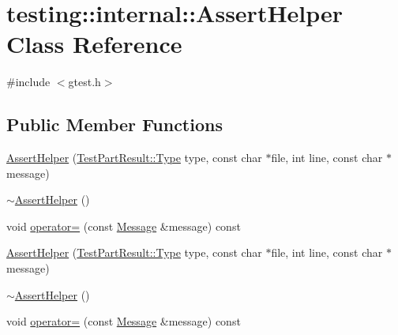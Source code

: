 \hypertarget{classtesting_1_1internal_1_1_assert_helper}{\section{testing\-:\-:internal\-:\-:Assert\-Helper Class Reference}
\label{classtesting_1_1internal_1_1_assert_helper}
}


{\ttfamily \#include $<$gtest.\-h$>$}

\subsection*{Public Member Functions}
\begin{DoxyCompactItemize}
\item 
\hyperlink{classtesting_1_1internal_1_1_assert_helper_ac2c9334518fd4087189b4505567a3c90}{Assert\-Helper} (\hyperlink{classtesting_1_1_test_part_result_a65ae656b33fdfdfffaf34858778a52d5}{Test\-Part\-Result\-::\-Type} type, const char $\ast$file, int line, const char $\ast$message)
\item 
\hyperlink{classtesting_1_1internal_1_1_assert_helper_a51c640785d4ed4a0155cc9aa857d8931}{$\sim$\-Assert\-Helper} ()
\item 
void \hyperlink{classtesting_1_1internal_1_1_assert_helper_ab721be11cb9aca8a361ca1f014ca5f80}{operator=} (const \hyperlink{classtesting_1_1_message}{Message} \&message) const 
\item 
\hyperlink{classtesting_1_1internal_1_1_assert_helper_ac2c9334518fd4087189b4505567a3c90}{Assert\-Helper} (\hyperlink{classtesting_1_1_test_part_result_a65ae656b33fdfdfffaf34858778a52d5}{Test\-Part\-Result\-::\-Type} type, const char $\ast$file, int line, const char $\ast$message)
\item 
\hyperlink{classtesting_1_1internal_1_1_assert_helper_a51c640785d4ed4a0155cc9aa857d8931}{$\sim$\-Assert\-Helper} ()
\item 
void \hyperlink{classtesting_1_1internal_1_1_assert_helper_ab721be11cb9aca8a361ca1f014ca5f80}{operator=} (const \hyperlink{classtesting_1_1_message}{Message} \&message) const 
\end{DoxyCompactItemize}


